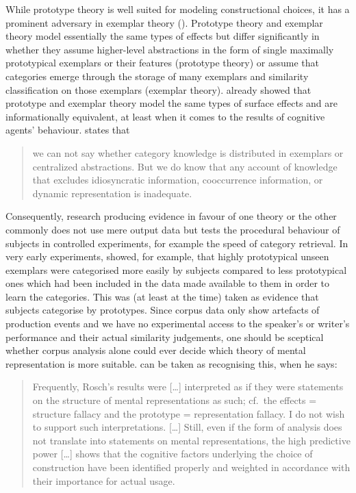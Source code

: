 While prototype theory is well suited for modeling constructional choices, it has a prominent adversary in exemplar theory (\citealt{MedinSchaffer1978,Hintzman1986}).
Prototype theory and exemplar theory model essentially the same types of effects but differ significantly in whether they assume higher-level abstractions in the form of single maximally prototypical exemplars or their features (prototype theory) or assume that categories emerge through the storage of many exemplars and similarity classification on those exemplars (exemplar theory).
\citet{Barsalou1990} already showed that prototype and exemplar theory model the same types of surface effects and are informationally equivalent, at least when it comes to the results of cognitive agents' behaviour.
\citet[84]{Barsalou1990} states that

\begin{quote}
  we can not say whether category knowledge is distributed in exemplars or centralized abstractions.
  But we do know that any account of knowledge that excludes idiosyncratic information, cooccurrence information, or dynamic representation is inadequate.
\end{quote}

Consequently, research producing evidence in favour of one theory or the other commonly does not use mere output data but tests the procedural behaviour of subjects in controlled experiments, for example the speed of category retrieval.
In very early experiments, \citet{PosnerKeele1968} showed, for example, that highly prototypical unseen exemplars were categorised more easily by subjects compared to less prototypical ones which had been included in the data made available to them in order to learn the categories.
This was (at least at the time) taken as evidence that subjects categorise by prototypes.
Since corpus data only show artefacts of production events and we have no experimental access to the speaker's or writer's performance and their actual similarity judgements, one should be sceptical whether corpus analysis alone could ever decide which theory of mental representation is more suitable.
\citet[22]{Gries2003} can be taken as recognising this, when he says:

\begin{quote}
  Frequently, Rosch’s results were [\ldots] interpreted as if they were statements on the structure of mental representations as such; cf.\ the effects = structure fallacy and the prototype = representation fallacy.
  I do not wish to support such interpretations.
  [\ldots]
  Still, even if the form of analysis does not translate into statements on mental representations, the high predictive power [\ldots] shows that the cognitive factors underlying the choice of construction have been identified properly and weighted in accordance with their importance for actual usage.
\end{quote}

